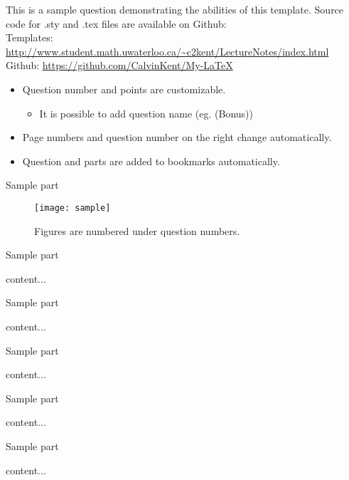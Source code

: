 \documentclass[11pt]{article} %
\begin{document}
\begin{qstn}[15][(Bonus) ][49.5]
	This is a sample question demonstrating the abilities of this template. Source code for .sty and .tex files are available on Github:\\[\baselineskip]
	Templates: \url{http://www.student.math.uwaterloo.ca/~c2kent/LectureNotes/index.html}\\
	Github: \url{https://github.com/CalvinKent/My-LaTeX}
	\begin{itemize}
		\item Question number and points are customizable.
		\begin{itemize}
			\item It is possible to add question name (eg. (Bonus))
		\end{itemize}
		\item Page numbers and question number on the right change automatically.
		\item Question and parts are added to bookmarks automatically.
	\end{itemize}
	\begin{soln}
	\end{soln}
	\begin{assgnenum}
		\qitem Sample part
		\begin{soln}
			\begin{figure}[H]
				\centering
				\texttt{[image: sample]}
				\caption{Figures are numbered under question numbers.}
			\end{figure}
			\vfill
		\end{soln}
		\newpage
		\qitem Sample part
		\begin{soln}
			content...
			\vfill
		\end{soln}
		\begin{assgnenum}
			\qitem Sample part
			\begin{soln}
				content...
				\vfill
			\end{soln}
			\qitem Sample part
			\begin{soln}
				content...
				\vfill
			\end{soln}
			\newpage
			\qitem Sample part
			\begin{soln}
				content...
				\vfill
			\end{soln}
		\end{assgnenum}
		\qitem Sample part
		\begin{soln}
			content...
			\vfill
		\end{soln}
	\end{assgnenum}
\end{qstn}
 
\end{document}
